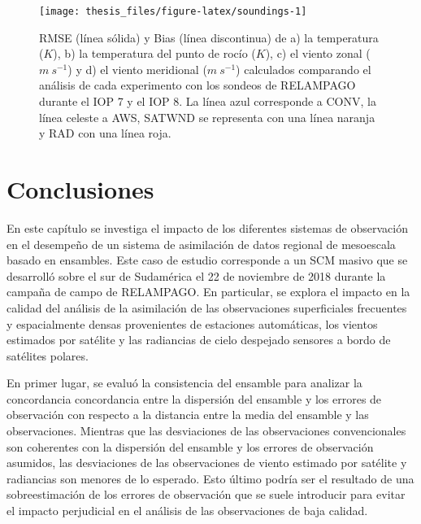 \documentclass[12pt,oneside,a4paper]{reedthesis}
\begin{document}
\begin{figure}

{\centering \texttt{[image: thesis\_files/figure-latex/soundings-1]} 

}

\caption{RMSE (línea sólida) y Bias (línea discontinua) de a) la temperatura (\(K\)), b) la temperatura del punto de rocío (\(K\)), c) el viento zonal (\(m\ s^{-1}\)) y d) el viento meridional (\(m\ s^{-1}\)) calculados comparando el análisis de cada experimento con los sondeos de RELAMPAGO durante el IOP 7 y el IOP 8. La línea azul corresponde a CONV, la línea celeste a AWS, SATWND se representa con una línea naranja y RAD con una línea roja.}\label{fig:soundings}
\end{figure}
\hypertarget{conclusiones}{%
\section{Conclusiones}\label{conclusiones}}

En este capítulo se investiga el impacto de los diferentes sistemas de observación en el desempeño de un sistema de asimilación de datos regional de mesoescala basado en ensambles. Este caso de estudio corresponde a un SCM masivo que se desarrolló sobre el sur de Sudamérica el 22 de noviembre de 2018 durante la campaña de campo de RELAMPAGO. En particular, se explora el impacto en la calidad del análisis de la asimilación de las observaciones superficiales frecuentes y espacialmente densas provenientes de estaciones automáticas, los vientos estimados por satélite y las radiancias de cielo despejado sensores a bordo de satélites polares.

En primer lugar, se evaluó la consistencia del ensamble para analizar la concordancia concordancia entre la dispersión del ensamble y los errores de observación con respecto a la distancia entre la media del ensamble y las observaciones. Mientras que las desviaciones de las observaciones convencionales son coherentes con la dispersión del ensamble y los errores de observación asumidos, las desviaciones de las observaciones de viento estimado por satélite y radiancias son menores de lo esperado. Esto último podría ser el resultado de una sobreestimación de los errores de observación que se suele introducir para evitar el impacto perjudicial en el análisis de las observaciones de baja calidad.
\end{document}
